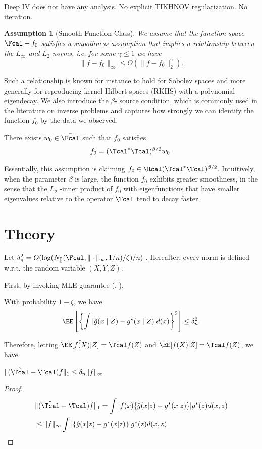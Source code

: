 \documentclass[14pt]{extarticle} %
\newtheorem{assumption}[theorem]{Assumption}
\begin{document}
\begin{remark}
    Deep IV \citep{hartford2017deep} does not have any analysis. No explicit TIKHNOV regularization.  No iteration. 
\end{remark}
\begin{assumption}[Smooth Function Class]\label{ass:smooth-func}
    We assume that the function space $\Fcal -f_0 $ satisfies
a smoothness assumption that implies a relationship between the $L_\infty$ and $L_2$ norms, i.e. for some $\gamma \leq 1$ we have $$
\|f - f_0\|_\infty \leq O(\|f - f_0\|_2^\gamma).
$$
\end{assumption}
Such a relationship is known for instance to hold for Sobolev spaces and more generally
for reproducing kernel Hilbert spaces (RKHS) with a polynomial eigendecay.
We also introduce the $\beta$- source condition, which is commonly used in the literature on inverse problems and captures how strongly we can identify the function $f_0$ by the data we observed. 
\begin{definition}\label{def:source-cond}
    There exists $w_0\in\bar{\Fcal}$ such that $f_0$ satisfies $$
    f_0 = (\Tcal^*\Tcal)^{\beta/2} w_0.
    $$
\end{definition}
Essentially, this assumption is claiming $
f_0 \in \Rcal(\Tcal^*\Tcal)^{\beta/2}$. Intuitively, when the parameter $\beta$ is large, the function $ f_0$ exhibits greater smoothness, in the sense that the $L_2$ -inner product of $f_0$ with eigenfunctions that have smaller eigenvalues relative to the operator $\Tcal$ tend to decay faster.

\section{Theory}

Let $\delta^2_n = O(\log(N_{[]}(\Fcal, \|\cdot\|_\infty, 1/n)/\zeta)/n)$ . Hereafter, every norm is defined w.r.t. the random variable $(X,Y,Z)$. 

First,  by invoking MLE guarantee (\citet[Theorem 21]{agarwal2020flambe}, \citet[Theorem 3.3]{ge2023provable}), 
\begin{lemma}
With probability $1-\zeta$, we have 
\begin{align*}
    \EE\left [\left \{\int |\hat g(x \mid Z) - g^{\star}(x\mid Z)|d(x) \right\}^2 \right] \leq \delta^2_n.  
\end{align*}
\end{lemma}
Therefore, letting  $\hat \EE[f(X)|Z]=\hat \Tcal f(Z)$ and $\EE[f(X)|Z]=\Tcal f(Z)$, we have 
\begin{lemma}\label{lem:appro}
    $ \|(\hat \Tcal-\Tcal)f\|_1\leq   \delta_n \|f\|_{\infty}.$
\end{lemma}
\begin{proof}
\begin{align*}
    &\|(\hat \Tcal-\Tcal)f\|_1 = \int |f(x)\{\hat g(x|z)-g^{\star}(x|z)\}|g^{\star}(z) d(x,z)\\
    &\leq \|f\|_{\infty} \int | \{\hat g(x|z)-g^{\star}(x|z)\}|g^{\star}(z) d(x,z). 
\end{align*}
\end{proof}
\end{document}
